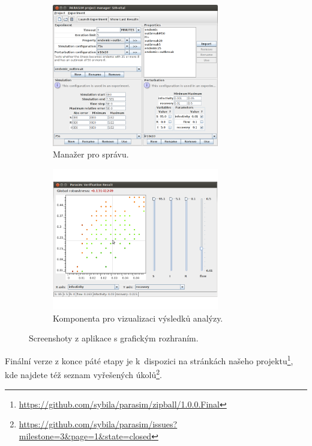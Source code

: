 \documentclass{parasim}
\begin{document}
\begin{figure}[h!]
	\centering
	\begin{subfigure}[b]{0.48\textwidth}
		\centering
		\includegraphics[width=0.8\textwidth]{1.0.0.Final/project-manager.png}
		\caption{Manažer pro správu.}
	\end{subfigure}
	\begin{subfigure}[b]{0.48\textwidth}
		\centering		
		\includegraphics[width=0.8\textwidth]{1.0.0.Final/plotter.png}
		\caption{Komponenta pro vizualizaci výsledků analýzy.}
	\end{subfigure}
	\caption{Screenshoty z aplikace s grafickým rozhraním.}
	\label{fig:gui}
\end{figure}

Finální verze z konce páté etapy je k~dispozici na stránkách našeho projektu\footnote{\url{https://github.com/sybila/parasim/zipball/1.0.0.Final}},
kde najdete též seznam vyřešených úkolů\footnote{\url{https://github.com/sybila/parasim/issues?milestone=3&page=1&state=closed}}.
\end{document}

